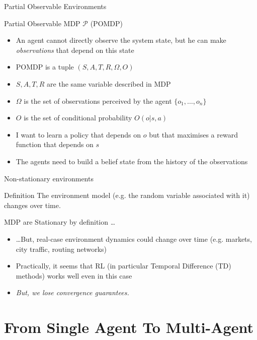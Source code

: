 \documentclass[presentation]{beamer}\mode<presentation>{\usetheme{AMSBolognaFC}}
\begin{document}
\begin{frame}{Partial Observable Environments}
	\begin{exampleblock}{Partial Observable MDP $\mathcal{P}$ (POMDP) \href{https://www.pomdp.org/}{\faLink}}
		\begin{itemize}
			\item An agent cannot directly observe the system state, but he can make \emph{observations} that depend on this state
			\item POMDP is a tuple $(S, A, T, R, \Omega, O)$
			\item $S, A, T, R$ are the same variable described in MDP
			\item $\Omega$ is the set of observations perceived by the agent $\{o_1, \dots, o_n\}$
			\item $O$ is the set of conditional probability $O(o | s, a)$
			\item I want to learn a policy that depends on $o$ but that maximises a reward function that depends on $s$
			\item The agents need to build a belief state from the history of the observations
		\end{itemize}
	\end{exampleblock}
\end{frame}
\begin{frame}[c]{Non-stationary environments}
	\begin{alertblock}{Definition}
		The environment model (e.g. the random variable associated with it) changes
		over time.
	\end{alertblock}
	\begin{exampleblock}{MDP are Stationary by definition \dots}
		\begin{itemize}
			\item \dots But, real-case environment dynamics could change over time (e.g. markets, city traffic, routing networks)
			\item Practically, it seems that RL (in particular Temporal Difference (TD) methods) works well even in this case
			\item \emph{But, we lose convergence guarantees.}
		\end{itemize}
	\end{exampleblock}
%
\end{frame}

\section{From Single Agent To Multi-Agent}
\end{document}
